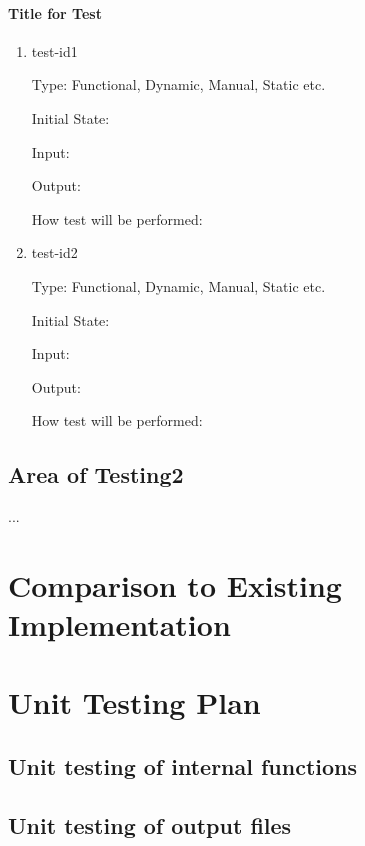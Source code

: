 \documentclass[12pt, titlepage]{article}
\begin{document}
\paragraph{Title for Test}

\begin{enumerate}

\item{test-id1\\}

Type: Functional, Dynamic, Manual, Static etc.
					
Initial State: 
					
Input: 
					
Output: 
					
How test will be performed: 
					
\item{test-id2\\}

Type: Functional, Dynamic, Manual, Static etc.
					
Initial State: 
					
Input: 
					
Output: 
					
How test will be performed: 

\end{enumerate}

\subsection{Area of Testing2}

...

	
\section{Comparison to Existing Implementation}	
				
\section{Unit Testing Plan}
		
\subsection{Unit testing of internal functions}
		
\subsection{Unit testing of output files}		
\end{document}
